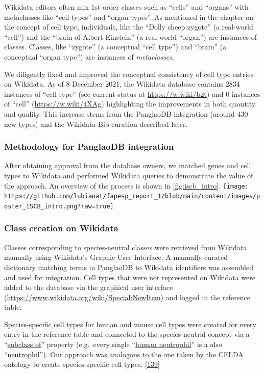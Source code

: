 Wikidata editors often mix 1st-order classes such as ``cells'' and ``organs'' with metaclasses like ``cell types'' and ``organ types''.
As mentioned in the chapter on the concept of cell type, individuals, like the ``Dolly sheep zygote'' (a real-world ``cell'') and the ``brain of Albert Einstein'' (a real-world ``organ'') are instances of classes.
Classes, like ``zygote'' (a conceptual ``cell type'') and ``brain'' (a conceptual ``organ type'') are instances of \emph{metaclasses}.

We diligently fixed and improved the conceptual consistency of cell type entries on Wikidata.
As of 8 December 2021, the Wikidata database contains 2834 instances of ``cell type'' (see current status at \url{https://w.wiki/b2t}) and 0 instances of ``cell'' (\url{https://w.wiki/4XAg}) highlighting the improvements in both quantity and quality.
This increase stems from the PanglaoDB integration (around 430 new types) and the Wikidata Bib curation described later.

\hypertarget{methodology-for-panglaodb-integration}{%
\subsubsection{Methodology for PanglaoDB integration}\label{methodology-for-panglaodb-integration}}

After obtaining approval from the database owners, we matched genes and cell types to Wikidata and performed Wikidata queries to demonstrate the value of the approach.
An overview of the process is shown in \ref{fig:iscb_intro}.
\texttt{[image: https://github.com/lubianat/fapesp\_report\_1/blob/main/content/images/poster\_ISCB\_intro.png?raw=true]}

\hypertarget{class-creation-on-wikidata}{%
\subsubsection{Class creation on Wikidata}\label{class-creation-on-wikidata}}

Classes corresponding to species-neutral classes were retrieved from Wikidata manually using Wikidata's Graphic User Interface.
A manually-curated dictionary matching terms in PanglaoDB to Wikidata identifiers was assembled and used for integration.
Cell types that were not represented on Wikidata were added to the database via the graphical user interface (\url{https://www.wikidata.org/wiki/Special:NewItem}) and logged in the reference table.

Species-specific cell types for human and mouse cell types were created for every entry in the reference table and connected to the species-neutral concept via a ``\href{http://www.wikidata.org/entity/P279}{subclass of}'' property (e.g.~every single ``\href{http://www.wikidata.org/entity/Q101405102}{human neutrophil}'' is a also ``\href{http://www.wikidata.org/entity/Q188417}{neutrophil}'').
Our approach was analogous to the one taken by the CELDA ontology to create species-specific cell types. {[}\protect\hyperlink{ref-RLHsA1U8}{139}{]}

